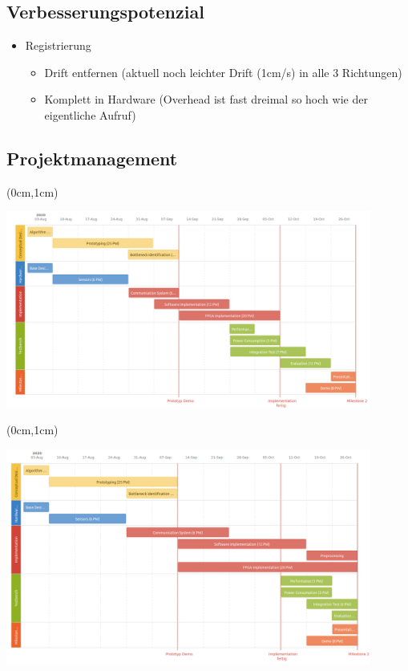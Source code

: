 \documentclass{beamer}
\begin{document}
\subsection{Verbesserungspotenzial}
\begin{frame}{\subsecname}
\begin{itemize}
\item{Registrierung}
\begin{itemize}
\item{Drift entfernen (aktuell noch leichter Drift (1cm/s) in alle 3 Richtungen)}
\item{Komplett in Hardware (Overhead ist fast dreimal so hoch wie der eigentliche Aufruf)}
\end{itemize}
\end{itemize}
\end{frame}

\subsection{Projektmanagement}
\begin{frame}{\subsecname}
\begin{textblock*}{12.7cm}(0cm,1cm)
\begin{center}
\includegraphics[width=12cm]{images/roadmap.png}
\end{center}
\end{textblock*}
\end{frame}

\begin{frame}{\subsecname}
\begin{textblock*}{12.7cm}(0cm,1cm)
\begin{center}
\includegraphics[width=12cm]{images/roadmap_new.png}
\end{center}
\end{textblock*}
\end{frame}
\end{document}

